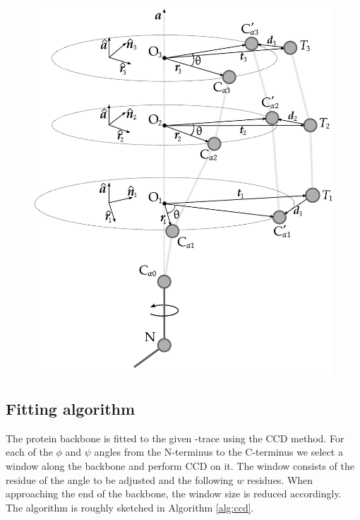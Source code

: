 \begin{figure}
  \centering
	\includegraphics[width=0.98\columnwidth]{figures/ccd}
	\label{fig:ccd}
  \caption{}
\end{figure}


\subsection{Fitting algorithm}
The protein backbone is fitted to the given \Ca-trace using the CCD method.
For each of the $\phi$ and $\psi$ angles from the N-terminus to the C-terminus we select a window along the backbone and perform CCD on it.
The window consists of the residue of the angle to be adjusted and the following $w$ residues. When approaching the end of the backbone, the window size is reduced accordingly.
The algorithm is roughly sketched in Algorithm \ref{alg:ccd}.



